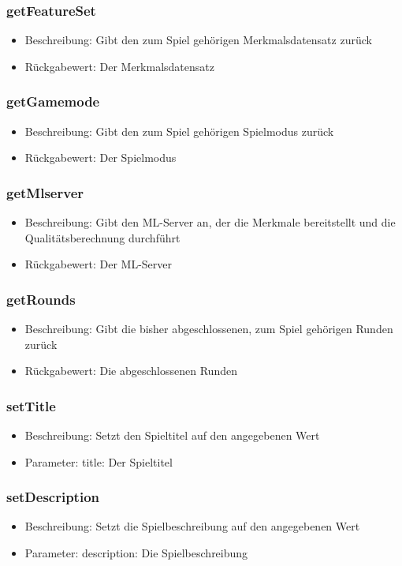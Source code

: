 \documentclass[a4paper]{scrreprt}
\begin{document}
	\subsubsection{getFeatureSet}
	\begin{itemize}
		\item Beschreibung: Gibt den zum Spiel gehörigen Merkmalsdatensatz zurück
		\item Rückgabewert: Der Merkmalsdatensatz
	\end{itemize}
	\subsubsection{getGamemode}
	\begin{itemize}
		\item Beschreibung: Gibt den zum Spiel gehörigen Spielmodus zurück
		\item Rückgabewert: Der Spielmodus
	\end{itemize}
	\subsubsection{getMlserver}
	\begin{itemize}
		\item Beschreibung: Gibt den ML-Server an, der die Merkmale bereitstellt und die Qualitätsberechnung durchführt
		\item Rückgabewert: Der ML-Server
	\end{itemize}
	\subsubsection{getRounds}
	\begin{itemize}
		\item Beschreibung: Gibt die bisher abgeschlossenen, zum Spiel gehörigen Runden zurück
		\item Rückgabewert: Die abgeschlossenen Runden
	\end{itemize}
	\subsubsection{setTitle}
	\begin{itemize}
		\item Beschreibung: Setzt den Spieltitel auf den angegebenen Wert
		\item Parameter: title: Der Spieltitel
	\end{itemize}
	\subsubsection{setDescription}
	\begin{itemize}
		\item Beschreibung: Setzt die Spielbeschreibung auf den angegebenen Wert
		\item Parameter: description: Die Spielbeschreibung
	\end{itemize}
\end{document}
